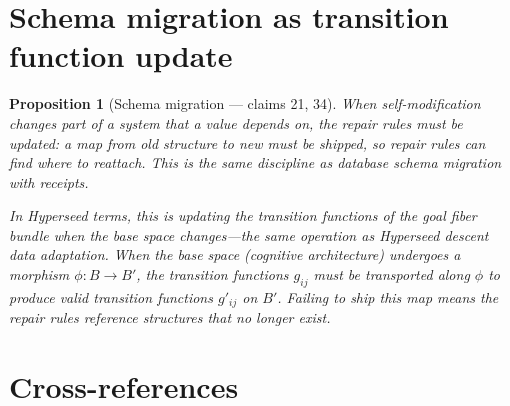 \documentclass[11pt,a4paper]{article}
\newtheorem{proposition}[definition]{Proposition}
\begin{document}

\section{Schema migration as transition function update}
\label{sec:schema}

\begin{proposition}[Schema migration --- claims 21, 34]
\label{prop:schema}
When self-modification changes part of a system that a value depends on,
the repair rules must be updated: a map from old structure to new must
be shipped, so repair rules can find where to reattach. This is the same
discipline as database schema migration with receipts.

In Hyperseed terms, this is updating the transition functions of the goal
fiber bundle when the base space changes---the same operation as Hyperseed
descent data adaptation. When the base space (cognitive architecture)
undergoes a morphism $\phi : B \to B'$, the transition functions
$g_{ij}$ must be transported along $\phi$ to produce valid transition
functions $g'_{ij}$ on $B'$. Failing to ship this map means the repair
rules reference structures that no longer exist.
\end{proposition}


\section{Cross-references}
\end{document}
